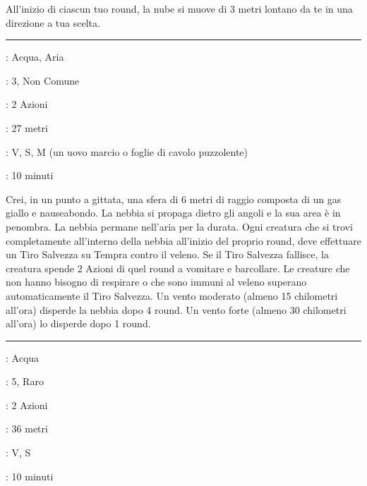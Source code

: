 \begin{multicols}{2}
All'inizio di ciascun tuo round, la nube si muove di 3 metri lontano da te in una direzione a tua scelta.

\smallskip\noindent\rule{\linewidth}{2pt} \hypertarget{Nebbia Nauseante}{}\medskip{}
\noindent
\begin{description}[noitemsep, topsep=0pt, parsep=0pt, partopsep=0pt, leftmargin=0cm, labelwidth=2.8cm]
	\item[\textbf{Lista di Magia}]: Acqua, Aria
	\item[\textbf{Livello}]: 3, Non Comune
	\item[\textbf{T. di Lancio}]: 2 Azioni
	\item[\textbf{Gittata}]: 27 metri
	\item[\textbf{Componenti}]: V, S, M (un uovo marcio o foglie di cavolo puzzolente)
	\item[\textbf{Durata}]: 10 minuti
\end{description}

Crei, in un punto a gittata, una sfera di 6 metri di raggio composta di un gas giallo e nauseabondo. La nebbia si propaga dietro gli angoli e la sua area è in penombra. La nebbia permane nell'aria per la durata. Ogni creatura che si trovi completamente all'interno della nebbia all'inizio del proprio round, deve effettuare un Tiro Salvezza su Tempra contro il veleno. Se il Tiro Salvezza fallisce, la creatura spende 2 Azioni di quel round a vomitare e barcollare. Le creature che non hanno bisogno di respirare o che sono immuni al veleno superano automaticamente il Tiro Salvezza. Un vento moderato (almeno 15 chilometri all'ora) disperde la nebbia dopo 4 round. Un vento forte (almeno 30 chilometri all'ora) lo disperde dopo 1 round.

\smallskip\noindent\rule{\linewidth}{2pt} \hypertarget{Nebbia mortale}{}\medskip{}
\noindent
\begin{description}[noitemsep, topsep=0pt, parsep=0pt, partopsep=0pt, leftmargin=0cm, labelwidth=2.8cm]
	\item[\textbf{Lista di Magia}]: Acqua
	\item[\textbf{Livello}]: 5, Raro
	\item[\textbf{T. di Lancio}]: 2 Azioni
	\item[\textbf{Gittata}]: 36 metri
	\item[\textbf{Componenti}]: V, S
	\item[\textbf{Durata}]: 10 minuti
\end{description}


\end{multicols}
